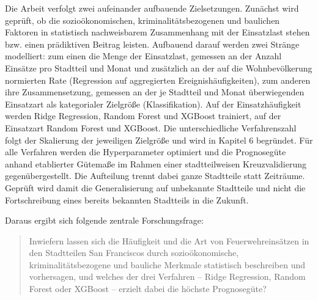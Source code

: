\documentclass[12pt,a4paper]{article}
\begin{document}

Die Arbeit verfolgt zwei aufeinander aufbauende Zielsetzungen. Zunächst wird geprüft, ob die
sozioökonomischen, kriminalitätsbezogenen und baulichen Faktoren in statistisch nachweisbarem
Zusammenhang mit der Einsatzlast stehen bzw. einen prädiktiven Beitrag leisten. Aufbauend darauf
werden zwei Stränge modelliert: zum einen die Menge der Einsatzlast, gemessen an der Anzahl
Einsätze pro Stadtteil und Monat und zusätzlich an der auf die Wohnbevölkerung normierten Rate
(Regression auf aggregierten Ereignishäufigkeiten), zum anderen ihre Zusammensetzung, gemessen an der je Stadtteil und Monat überwiegenden Einsatzart als kategorialer Zielgröße (Klassifikation). Auf der Einsatzhäufigkeit werden Ridge Regression,
Random Forest und XGBoost trainiert, auf der Einsatzart Random Forest und XGBoost. Die
unterschiedliche Verfahrenszahl folgt der Skalierung der jeweiligen Zielgröße und wird in
Kapitel 6 begründet. Für alle Verfahren werden die Hyperparameter optimiert und die
Prognosegüte anhand etablierter Gütemaße im Rahmen einer stadtteilweisen
Kreuzvalidierung gegenübergestellt. Die Aufteilung trennt dabei ganze
Stadtteile statt Zeiträume. Geprüft wird damit die Generalisierung auf unbekannte Stadtteile und
nicht die Fortschreibung eines bereits bekannten Stadtteils in die Zukunft.


Daraus ergibt sich folgende zentrale Forschungsfrage:

\begin{quote}
Inwiefern lassen sich die Häufigkeit und die Art von Feuerwehreinsätzen in den Stadtteilen
San Franciscos durch sozioökonomische, kriminalitätsbezogene und bauliche Merkmale statistisch
beschreiben und vorhersagen, und welches der drei Verfahren -- Ridge Regression, Random Forest
oder XGBoost -- erzielt dabei die höchste Prognosegüte?
\end{quote}
\end{document}
